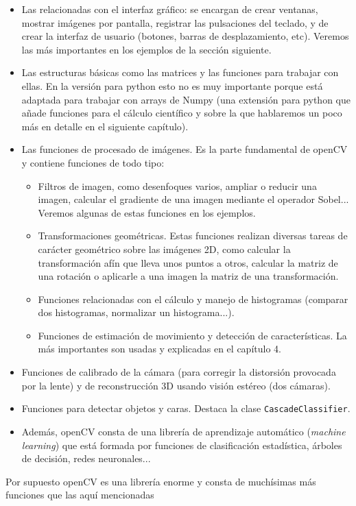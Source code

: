 \documentclass[a4paper,openright, 12pt]{book}
\begin{document}
\begin{itemize}
\item Las relacionadas con el interfaz gráfico: se encargan de crear ventanas, mostrar imágenes por pantalla, registrar las pulsaciones del teclado, y de crear la interfaz de usuario (botones, barras de desplazamiento, etc). Veremos las más importantes en los ejemplos de la sección siguiente.
\item Las estructuras básicas como las matrices y las funciones para trabajar con ellas. En la versión para python esto no es muy importante porque está adaptada para trabajar con arrays de Numpy (una extensión para python que añade funciones para el cálculo científico y sobre la que hablaremos un poco más en detalle en el siguiente capítulo).
\item Las funciones de procesado de imágenes. Es la parte fundamental de openCV y contiene funciones de todo tipo: 
\begin{itemize}
\item Filtros de imagen, como desenfoques varios, ampliar o reducir una imagen, calcular el gradiente de una imagen mediante el operador Sobel...
\newline Veremos algunas de estas funciones en los ejemplos.
\item Transformaciones geométricas. Estas funciones realizan diversas tareas de carácter geométrico sobre las imágenes 2D, como calcular la transformación afín que lleva unos puntos a otros, calcular la matriz de una rotación o aplicarle a una imagen la matriz de una transformación.
\item Funciones relacionadas con el cálculo y manejo de histogramas (comparar dos histogramas, normalizar un histograma...).
\item Funciones de estimación de movimiento y detección de características. La más importantes son usadas y explicadas en el capítulo 4.
\end{itemize}
\item Funciones de calibrado de la cámara (para corregir la distorsión provocada por la lente) y de reconstrucción 3D usando visión estéreo (dos cámaras).
\item Funciones para detectar objetos y caras. Destaca la clase \lstinline|CascadeClassifier|.
\item Además, openCV consta de una librería de aprendizaje automático (\textit{machine learning}) que está formada por funciones de clasificación estadística, árboles de decisión, redes neuronales...
\end{itemize}
Por supuesto openCV es una librería enorme y consta de muchísimas más funciones que las aquí mencionadas\newpage
\end{document}
